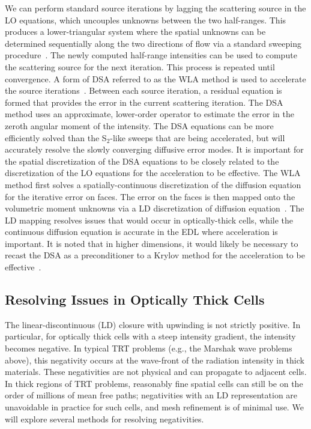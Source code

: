 \documentclass[11pt]{article}
\begin{document}
We can perform standard source iterations by lagging the scattering source in the LO
equations, which
uncouples unknowns between the two half-ranges.  This produces a lower-triangular
system where the spatial unknowns can be determined sequentially along the two directions of flow via a
standard sweeping procedure~\cite{lewis,morel_newton}.  The newly computed half-range
intensities can be used to compute the scattering source for the next iteration.  This
process is repeated until convergence.  
A form of DSA referred to as the WLA method is used to accelerate the source iterations~\cite{wla}. 
Between each source iteration, a residual equation is formed that provides 
the error in the current scattering iteration. The DSA method uses an approximate,
lower-order operator to estimate the error in the zeroth angular moment of the
intensity.  The DSA equations can be more efficiently
solved than the S$_2$-like sweeps that are being accelerated, but will accurately resolve the
slowly converging diffusive error modes.  It is important for the spatial discretization of the DSA
equations to be closely related to the discretization of the LO equations for the
acceleration to be effective.  The WLA method first solves a spatially-continuous
discretization of the diffusion equation
for the iterative error on faces.  The error on the faces is then mapped onto the
volumetric moment unknowns via a LD discretization of diffusion equation~\cite{wla}.
The LD mapping resolves issues that would occur in optically-thick cells, while the
continuous diffusion equation is accurate in the EDL where acceleration is important.
It is noted that in higher dimensions, it would likely be necessary to recast the DSA as a
preconditioner to a Krylov method for the acceleration to be
effective~\cite{morel_newton}.



\subsection{Resolving Issues in Optically Thick Cells}
\label{sec:negs}

The linear-discontinuous (LD) closure with upwinding is not strictly positive.  In particular, for
optically thick cells with a steep intensity gradient, the intensity becomes
negative. In typical TRT problems (e.g., the Marshak wave problems above), this negativity occurs at the wave-front of the
radiation intensity in thick materials.
These negativities are not physical and can propagate to adjacent cells. In thick regions of
TRT problems, reasonably fine spatial cells can still be on the order of millions of mean
free paths; negativities with an LD representation are unavoidable in practice for
such cells, and mesh refinement is of minimal use.  We will explore several methods
for resolving negativities.  
\end{document}
